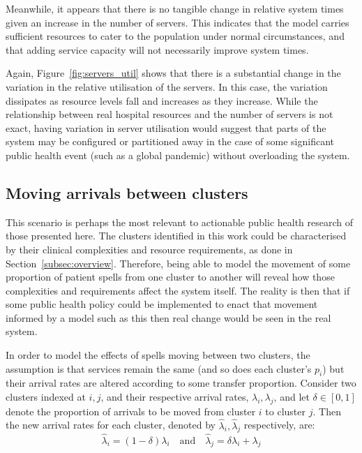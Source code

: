 Meanwhile, it appears that there is no tangible change in relative system times
given an increase in the number of servers. This indicates that the model
carries sufficient resources to cater to the population under normal
circumstances, and that adding service capacity will not necessarily improve
system times.

Again, Figure~\ref{fig:servers_util} shows that there is a substantial change in
the variation in the relative utilisation of the servers. In this case, the
variation dissipates as resource levels fall and increases as they increase.
While the relationship between real hospital resources and the number of servers
is not exact, having variation in server utilisation would suggest that parts of
the system may be configured or partitioned away in the case of some significant
public health event (such as a global pandemic) without overloading the system.


\subsection{Moving arrivals between clusters}\label{subsec:moving}

This scenario is perhaps the most relevant to actionable public health research
of those presented here. The clusters identified in this work could be
characterised by their clinical complexities and resource requirements, as done
in Section~\ref{subsec:overview}. Therefore, being able to model the movement of
some proportion of patient spells from one cluster to another will reveal how
those complexities and requirements affect the system itself. The reality is
then that if some public health policy could be implemented to enact that
movement informed by a model such as this then real change would be seen in the
real system.

In order to model the effects of spells moving between two clusters, the
assumption is that services remain the same (and so does each cluster's \(p_i\))
but their arrival rates are altered according to some transfer proportion.
Consider two clusters indexed at \(i, j\), and their respective arrival rates,
\(\lambda_i, \lambda_j\), and let \(\delta \in [0, 1]\) denote the proportion of
arrivals to be moved from cluster \(i\) to cluster \(j\). Then the new arrival
rates for each cluster, denoted by \(\hat\lambda_i, \hat\lambda_j\)
respectively, are:
\begin{equation}\label{eq:moving}
    \hat\lambda_i = \left(1 - \delta\right) \lambda_i
    \quad \text{and} \quad
    \hat\lambda_j = \delta\lambda_i + \lambda_j
\end{equation}

